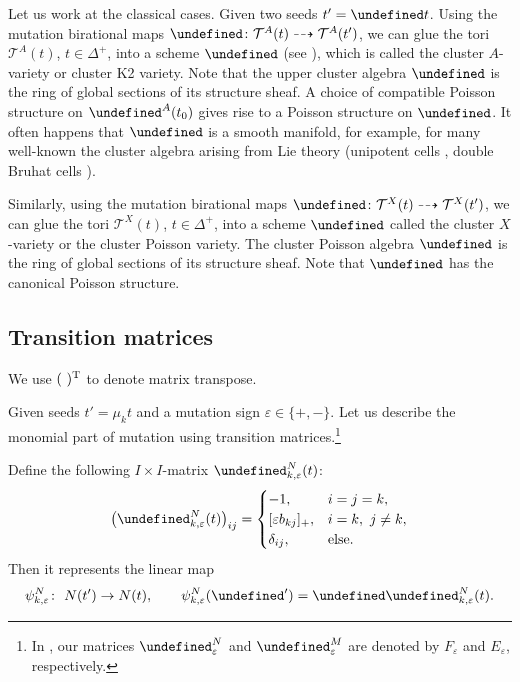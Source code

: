 \documentclass[10pt,a4paper]{amsart}
\newcommand{\opname}[1]{\operatorname{\mathsf{#1}}}
\newcommand{\cT}{{\mathcal T}}
\newcommand{\torus}{\cT}%
\let\upClAlg\undefined
\let\XClAlg\undefined
\let\AVar\undefined
\let\XVar\undefined
\let\LP\undefined
\let\seq\undefined
\let\trans\undefined
\let\ee\undefined
\let\uee\undefined
\newcommand{\upClAlg}{\mathcal{U}^A}
\newcommand{\XClAlg}{\mathcal{U}^X}
\newcommand{\AVar}{\mathbb{A}}
\newcommand{\XVar}{\mathbb{X}}
\newcommand{\LP}{{\mathcal{LP}}}
\newcommand{\seq}{\boldsymbol{\mu}}%
\newcommand{\trans}{\opname{P}}
\newcommand{\ee}{\mathbf{e}}
\newcommand{\uee}{\underline{\ee}}
\numberwithin{equation}{section}
\begin{document}
Let us work at the classical cases. Given two seeds $t'=\seq t$. Using the mutation birational maps $\seq\colon\torus^{A}(t)\dashrightarrow\torus^{A}(t')$,
we can glue the tori $\cT^{A}(t)$, $t\in\Delta^{+}$, into a scheme
$\AVar$ (see \cite[Proposition~2.4]{gross2013birational}), which
is called the cluster $A$-variety or cluster K2 variety. Note that
the upper cluster algebra $\upClAlg$ is the ring of global sections
of its structure sheaf. A choice of compatible Poisson structure on
$\LP^{A}(t_{0})$ gives rise to a Poisson structure on $\AVar$. It
often happens that $\AVar$ is a smooth manifold, for example, for
many well-known the cluster algebra arising from Lie theory (unipotent
cells \cite{GeissLeclercSchroeer10}, double Bruhat cells \cite{BerensteinFominZelevinsky05,goodearl2016berenstein}).

Similarly, using the mutation birational maps $\seq\colon\cT^{X}(t)\dashrightarrow\cT^{X}(t')$,
we can glue the tori $\cT^{X}(t)$, $t\in\Delta^{+}$, into a scheme
$\XVar$ called the cluster $X$-variety or the cluster Poisson variety. The cluster Poisson algebra
$\XClAlg$ is the ring of global sections of its structure sheaf.
Note that $\XVar$ has the canonical Poisson structure.

\subsection{Transition matrices}

We use $(\ )^{\rm T}$ to denote matrix transpose.

Given seeds $t'=\mu_{k}t$ and a mutation sign $\varepsilon\in\{+,-\}$.
Let us describe the monomial part of mutation using transition matrices.\footnote{In \cite{BerensteinZelevinsky05}, our matrices $\trans_{\varepsilon}^{N}$
and $\trans_{\varepsilon}^{M}$ are denoted by $F_{\varepsilon}$
and $E_{\varepsilon}$, respectively.}

Define the following $I\times I$-matrix $\trans_{k,\varepsilon}^{N}(t)$:
\begin{gather*}
\bigl(\trans_{k,\varepsilon}^{N}(t)\bigr)_{ij} = \begin{cases}
-1, & i=j=k,\\{}
[\varepsilon b_{kj}]_{+}, & i=k,\ j\neq k,\\
\delta_{ij}, & \mathrm{else}.
\end{cases}
\end{gather*}
Then it represents the linear map
\[\psi_{k,\varepsilon}^{N}\colon\ N(t')\rightarrow N(t),\qquad \psi_{k,\varepsilon}^{N}(\uee') =\uee\trans_{k,\varepsilon}^{N}(t).\]
\end{document}
